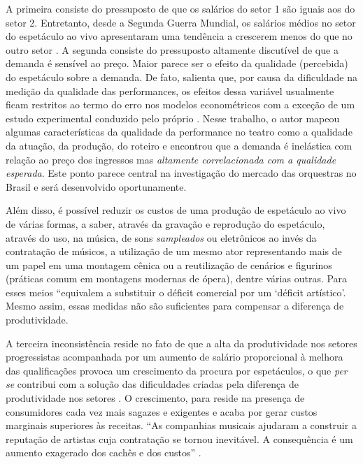 \documentclass[a4paper, 12pt, openright, oneside, german, french, english, brazil]{abntex2}
\begin{document}
	A primeira consiste do pressuposto de que os salários do setor 1 são iguais aos do setor 2. Entretanto, desde a Segunda Guerra Mundial, os salários médios no setor do espetáculo ao vivo apresentaram uma tendência a crescerem menos do que no outro setor . A segunda consiste do pressuposto altamente discutível de que a demanda é sensível ao preço. Maior parece ser o efeito da qualidade (percebida) do espetáculo sobre a demanda. De fato,  salienta que, por causa da dificuldade na medição da qualidade das performances, os efeitos dessa variável usualmente ficam restritos ao termo do erro nos modelos econométricos com a exceção de um estudo experimental conduzido pelo próprio . Nesse trabalho, o autor mapeou algumas características da qualidade da performance no teatro como a qualidade da atuação, da produção, do roteiro e encontrou que a demanda é inelástica com relação ao preço dos ingressos mas \textit{altamente correlacionada com a qualidade esperada}. Este ponto parece central na investigação do mercado das orquestras no Brasil e será desenvolvido oportunamente.
	
	Além disso, é possível reduzir os custos de uma produção de espetáculo ao vivo de várias formas, a saber, através da gravação e reprodução do espetáculo, através do uso, na música, de sons \textit{sampleados} ou eletrônicos ao invés da contratação de músicos, a utilização de um mesmo ator representando mais de um papel em uma montagem cênica ou a reutilização de cenários e figurinos (práticas comum em montagens modernas de ópera), dentre várias outras. Para  esses meios ``equivalem a substituir o déficit comercial por um `déficit artístico'. Mesmo assim, essas medidas não são suficientes para compensar a diferença de produtividade. 
	
	A terceira inconsistência reside no fato de que a alta da produtividade nos setores progressistas acompanhada por um aumento de salário proporcional à melhora das qualificações provoca um crescimento da procura por espetáculos, o que \textit{per se} contribui com a solução das dificuldades criadas pela diferença de produtividade nos setores . O crescimento, para  reside na presença de consumidores cada vez mais sagazes e exigentes e acaba por gerar custos marginais superiores às receitas. ``As companhias musicais ajudaram a construir a reputação de artistas cuja contratação se tornou inevitável. A consequência é um aumento exagerado dos cachês e dos custos'' \cite[p. 61]{benhamou2007economia}. 
	
\end{document}
